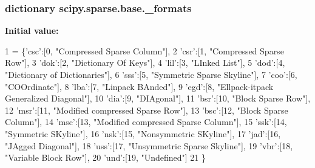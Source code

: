 \subsubsection[{\+\_\+formats}]{\setlength{\rightskip}{0pt plus 5cm}dictionary scipy.\+sparse.\+base.\+\_\+formats}\label{namespacescipy_1_1sparse_1_1base_aca2217a1daada66e8bf46eba9bf049cb}
{\bfseries Initial value\+:}
\begin{DoxyCode}
1 = \{\textcolor{stringliteral}{'csc'}:[0, \textcolor{stringliteral}{"Compressed Sparse Column"}],
2             \textcolor{stringliteral}{'csr'}:[1, \textcolor{stringliteral}{"Compressed Sparse Row"}],
3             \textcolor{stringliteral}{'dok'}:[2, \textcolor{stringliteral}{"Dictionary Of Keys"}],
4             \textcolor{stringliteral}{'lil'}:[3, \textcolor{stringliteral}{"LInked List"}],
5             \textcolor{stringliteral}{'dod'}:[4, \textcolor{stringliteral}{"Dictionary of Dictionaries"}],
6             \textcolor{stringliteral}{'sss'}:[5, \textcolor{stringliteral}{"Symmetric Sparse Skyline"}],
7             \textcolor{stringliteral}{'coo'}:[6, \textcolor{stringliteral}{"COOrdinate"}],
8             \textcolor{stringliteral}{'lba'}:[7, \textcolor{stringliteral}{"Linpack BAnded"}],
9             \textcolor{stringliteral}{'egd'}:[8, \textcolor{stringliteral}{"Ellpack-itpack Generalized Diagonal"}],
10             \textcolor{stringliteral}{'dia'}:[9, \textcolor{stringliteral}{"DIAgonal"}],
11             \textcolor{stringliteral}{'bsr'}:[10, \textcolor{stringliteral}{"Block Sparse Row"}],
12             \textcolor{stringliteral}{'msr'}:[11, \textcolor{stringliteral}{"Modified compressed Sparse Row"}],
13             \textcolor{stringliteral}{'bsc'}:[12, \textcolor{stringliteral}{"Block Sparse Column"}],
14             \textcolor{stringliteral}{'msc'}:[13, \textcolor{stringliteral}{"Modified compressed Sparse Column"}],
15             \textcolor{stringliteral}{'ssk'}:[14, \textcolor{stringliteral}{"Symmetric SKyline"}],
16             \textcolor{stringliteral}{'nsk'}:[15, \textcolor{stringliteral}{"Nonsymmetric SKyline"}],
17             \textcolor{stringliteral}{'jad'}:[16, \textcolor{stringliteral}{"JAgged Diagonal"}],
18             \textcolor{stringliteral}{'uss'}:[17, \textcolor{stringliteral}{"Unsymmetric Sparse Skyline"}],
19             \textcolor{stringliteral}{'vbr'}:[18, \textcolor{stringliteral}{"Variable Block Row"}],
20             \textcolor{stringliteral}{'und'}:[19, \textcolor{stringliteral}{"Undefined"}]
21             \}
\end{DoxyCode}
\hypertarget{namespacescipy_1_1sparse_1_1base_a714d51e90e4241e27a2d0ebd56703d46}{}

